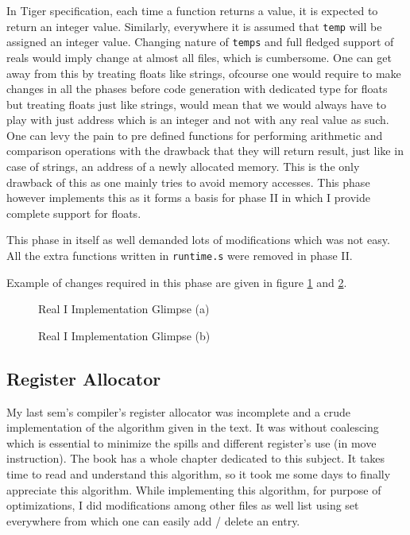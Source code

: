 In Tiger specification, each time a function returns a value, it is expected to return an integer value. Similarly, everywhere it is assumed that \texttt{temp} will be assigned an integer value. Changing nature of \texttt{temps} and full fledged support of reals would imply change at almost all files, which is cumbersome. One can get away from this by treating floats like strings, ofcourse one would require to make changes in all the phases before code generation with dedicated type for floats but treating floats just like strings, would mean that we would always have to play with just address which is an integer and not with any real value as such. One can levy the pain to pre defined functions for performing arithmetic and comparison operations with the drawback that they will return result, just like in case of strings, an address of a newly allocated memory. This is the only drawback of this as one mainly tries to avoid memory accesses. This phase however implements this as it forms a basis for phase II in which I provide complete support for floats.

This phase in itself as well demanded lots of modifications which was not easy. All the extra functions written in \texttt{runtime.s} were removed in phase II.

Example of changes required in this phase are given in figure \ref{fig:rphi1} and \ref{fig:rphi2}.

\begin{figure}
\centering
{}
\caption{Real I Implementation Glimpse (a)}
\label{fig:rphi1}
\end{figure}

\begin{figure}
\centering
{}
\caption{Real I Implementation Glimpse (b)}
\label{fig:rphi2}
\end{figure}

\subsection{Register Allocator}

My last sem's compiler's register allocator was incomplete and a crude implementation of the algorithm given in the text. It was without coalescing which is essential to minimize the spills and different register's use (in move instruction). The book has a whole chapter dedicated to this subject. It takes time to read and understand this algorithm, so it took me some days to finally appreciate this algorithm. While implementing this algorithm, for purpose of optimizations, I did modifications among other files as well list using set everywhere from which one can easily add / delete an entry. 

